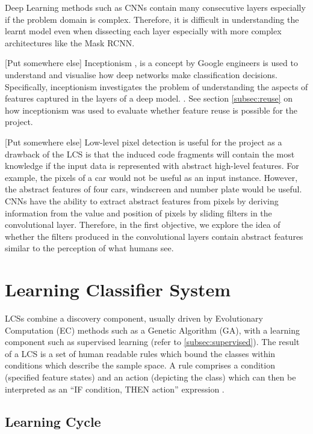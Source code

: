 Deep Learning methods such as CNNs contain many consecutive layers especially if the problem domain is complex. Therefore, it is difficult in understanding the learnt model even when dissecting each layer especially with more complex architectures like the Mask RCNN. 

[Put somewhere else]
Inceptionism \cite{szegedy2015going}, is a concept by Google engineers is used to understand and visualise how deep networks make classification decisions. Specifically, inceptionism investigates the problem of understanding the aspects of features captured in the layers of a deep model.
 \cite{mordvintsev2015inceptionism}. See section \ref{subsec:reuse} on how inceptionism was used to evaluate whether feature reuse is possible for the project.


[Put somewhere else]
Low-level pixel detection is useful for the project as a drawback of the LCS is that the induced code fragments will contain the most knowledge if the input data is represented with abstract high-level features. For example, the pixels of a car would not be useful as an input instance. However, the abstract features of four cars, windscreen and number plate would be useful. CNNs have the ability to extract abstract features from pixels by deriving information from the value and  position of pixels by sliding filters in the convolutional layer. Therefore, in the first objective, we explore the idea of whether the filters produced in the convolutional layers contain abstract features similar to the perception of what humans see.


\section{Learning Classifier System}
LCSs combine a discovery component, usually driven by Evolutionary Computation (EC) methods such as a Genetic Algorithm (GA), with a learning component \cite{urbanowicz2017introduction} such as supervised learning (refer to \ref{subsec:supervised}). The result of a LCS is a set of human readable rules which bound the classes within conditions which describe the sample space. A rule comprises a condition (specified feature states) and an action (depicting the class) which can then be interpreted as an ``IF condition, THEN action'' expression \cite{urbanowicz2017introduction}.

\subsection{Learning Cycle}

